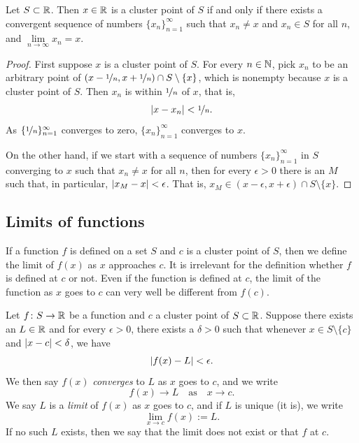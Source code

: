 \begin{prop}
Let $S \subset {\mathbb{R}}$.  Then $x \in {\mathbb{R}}$ is a cluster point of $S$
if and only if
there exists a convergent sequence of numbers $\{ x_n \}_{n=1}^\infty$ such that
$x_n \not= x$ and $x_n \in S$ for all $n$, and $\lim\limits_{n\to\infty} x_n = x$.
\end{prop}

\begin{proof}
First suppose $x$ is a cluster point of $S$.
For every $n \in {\mathbb{N}}$, pick $x_n$ to be an arbitrary point of
$(x-\nicefrac{1}{n},x+\nicefrac{1}{n}) \cap S \setminus \{x\}$, which
is nonempty because $x$ is a cluster point of $S$.
Then
$x_n$ is within $\nicefrac{1}{n}$ of $x$, that is,
\begin{equation*}
\abs{x-x_n} < \nicefrac{1}{n} .
\avoidbreak
\end{equation*}
As $\{ \nicefrac{1}{n} \}_{n=1}^\infty$ converges to zero,
$\{ x_n \}_{n=1}^\infty$ converges to $x$.

On the other hand, if we start with a sequence of numbers
$\{ x_n \}_{n=1}^\infty$ in $S$
converging to $x$ such that $x_n \not= x$ for all $n$, then for every
$\epsilon > 0$ there is an $M$ such that, in particular, $\left\lvert {x_M - x} \right\rvert <
\epsilon$.  That is, $x_M \in (x-\epsilon,x+\epsilon) \cap S \setminus \{x\}$.
\end{proof}

\subsection{Limits of functions}

If a function $f$ is defined on a set $S$ and $c$ is a cluster point of $S$,
then we define the limit of $f(x)$ as $x$ approaches $c$.  
It is irrelevant for the definition whether $f$ is defined at $c$ or not.
Even if the function is defined at $c$, the limit of the
function as $x$ goes to $c$ can very well be different
from $f(c)$.

\begin{defn}
%
Let $f \colon S \to {\mathbb{R}}$ be a function and $c$ a cluster point of
$S \subset {\mathbb{R}}$.
Suppose there exists an $L \in {\mathbb{R}}$ and for every $\epsilon > 0$,
there exists a $\delta > 0$ such that whenever $x \in S \setminus \{ c \}$
and $\left\lvert {x - c} \right\rvert < \delta$, we have
\begin{equation*}
\left\lvert {f(x) - L} \right\rvert < \epsilon .
\end{equation*}
We then say $f(x)$ \emph{converges} to $L$ as $x$ goes
to $c$, and we write
%
\begin{equation*}
f(x) \to L \quad\text{as}\quad x \to c .
\end{equation*}
We say $L$ is a \emph{limit} of $f(x)$ as $x$
goes to $c$, and if $L$ is unique (it is), we write
%
\begin{equation*}
\lim_{x \to c} f(x) := L .
\end{equation*}
If no such $L$ exists, then we say that the limit does not exist or
that $f$ \emph{} at $c$.
\end{defn}

